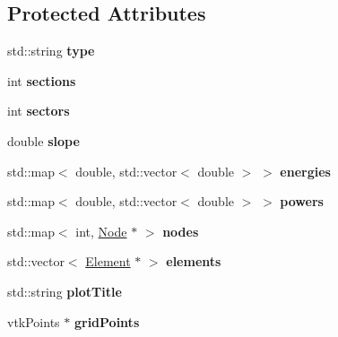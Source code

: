 \subsection*{Protected Attributes}
\begin{CompactItemize}
\item 
\hypertarget{classGeometry_734ed6644e4e3b98f157e6707c30069a}{
std::string \textbf{type}}
\label{classGeometry_734ed6644e4e3b98f157e6707c30069a}

\item 
\hypertarget{classGeometry_0efc4bf9252077abca96c1c198eefa33}{
int \textbf{sections}}
\label{classGeometry_0efc4bf9252077abca96c1c198eefa33}

\item 
\hypertarget{classGeometry_5e34644bfae4c1df92cb6bf98a8c62c7}{
int \textbf{sectors}}
\label{classGeometry_5e34644bfae4c1df92cb6bf98a8c62c7}

\item 
\hypertarget{classGeometry_1a43a92c349f4ce1f2dc2438bd6cbe1e}{
double \textbf{slope}}
\label{classGeometry_1a43a92c349f4ce1f2dc2438bd6cbe1e}

\item 
\hypertarget{classGeometry_89deb9b2585c4f7b1f47c6568e78ba54}{
std::map$<$ double, std::vector$<$ double $>$ $>$ \textbf{energies}}
\label{classGeometry_89deb9b2585c4f7b1f47c6568e78ba54}

\item 
\hypertarget{classGeometry_6babe7f0fe2ceaf892042432c75c17ca}{
std::map$<$ double, std::vector$<$ double $>$ $>$ \textbf{powers}}
\label{classGeometry_6babe7f0fe2ceaf892042432c75c17ca}

\item 
\hypertarget{classGeometry_9f5642ca54e0353b871d733e25ccc56e}{
std::map$<$ int, \hyperlink{classNode}{Node} $\ast$ $>$ \textbf{nodes}}
\label{classGeometry_9f5642ca54e0353b871d733e25ccc56e}

\item 
\hypertarget{classGeometry_cef6e83971679a9c4672c3b610acb58e}{
std::vector$<$ \hyperlink{classElement}{Element} $\ast$ $>$ \textbf{elements}}
\label{classGeometry_cef6e83971679a9c4672c3b610acb58e}

\item 
\hypertarget{classGeometry_ed9f7f434ae099a62be5c20f9915be90}{
std::string \textbf{plotTitle}}
\label{classGeometry_ed9f7f434ae099a62be5c20f9915be90}

\item 
\hypertarget{classGeometry_ed47a80e867e618e98272e830d297deb}{
vtkPoints $\ast$ \textbf{gridPoints}}
\label{classGeometry_ed47a80e867e618e98272e830d297deb}


\end{CompactItemize}
